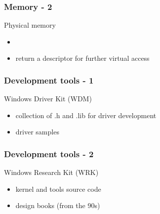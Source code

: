 
\begin{frame}
 \frametitle{Memory - 2}

 Physical memory

 \begin{itemize}
  \item {}
  \item return a descriptor for further virtual access
 \end{itemize}

\end{frame}


\begin{frame}
 \frametitle{Development tools - 1}

 Windows Driver Kit (WDM)

 \begin{itemize}
  \item collection of .h and .lib for driver development
  \item driver samples
 \end{itemize}

\end{frame}


\begin{frame}
 \frametitle{Development tools - 2}

 Windows Research Kit (WRK)

 \begin{itemize}
  \item kernel and tools source code
  \item design books (from the 90s)
 \end{itemize}

\end{frame}


